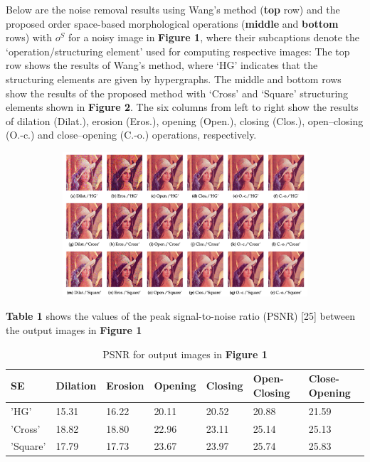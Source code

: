 Below are the noise removal results using Wang’s method (\textbf{top} row) and the proposed order space-based morphological operations (\textbf{middle} and \textbf{bottom} rows) with $o^S$ for a noisy image in \textbf{Figure 1}, where their subcaptions denote the ‘operation/structuring element’ used for computing respective images: The top row shows the results of Wang’s method, where ‘HG’ indicates that the structuring elements are given by hypergraphs. The middle and bottom rows show the results of the proposed method with ‘Cross’ and ‘Square’ structuring elements shown in \textbf{Figure 2}. The six columns from left to right show the results of dilation (Dilat.), erosion (Eros.), opening (Open.), closing (Clos.), open–closing (O.-c.) and close–opening (C.-o.) operations, respectively.\\

\begin{figure}[H]
    \centering
    \begin{subfigure}[t]{.9\textwidth}
    \includegraphics[width=0.9\linewidth]{images/result/result1.png}
    \centering
    \end{subfigure}
    \caption{}
\end{figure}


\textbf{Table 1} shows the values of the peak signal-to-noise ratio (PSNR) [25] between the output images in \textbf{Figure 1}

\begin{table}[H]
\caption{PSNR for output images in \textbf{Figure 1}}
\label{tab:psnr-tab}
\begin{tabular}{|l|l|l|l|l|l|l|}
\hline
SE       & Dilation & Erosion & Opening & Closing & Open-Closing & Close-Opening \\ \hline
'HG'     & 15.31    & 16.22   & 20.11   & 20.52   & 20.88        & 21.59         \\ \hline
'Cross'  & 18.82    & 18.80   & 22.96   & 23.11   & 25.14        & 25.13         \\ \hline
'Square' & 17.79    & 17.73   & 23.67   & 23.97   & 25.74        & 25.83         \\ \hline
\end{tabular}
\end{table}

